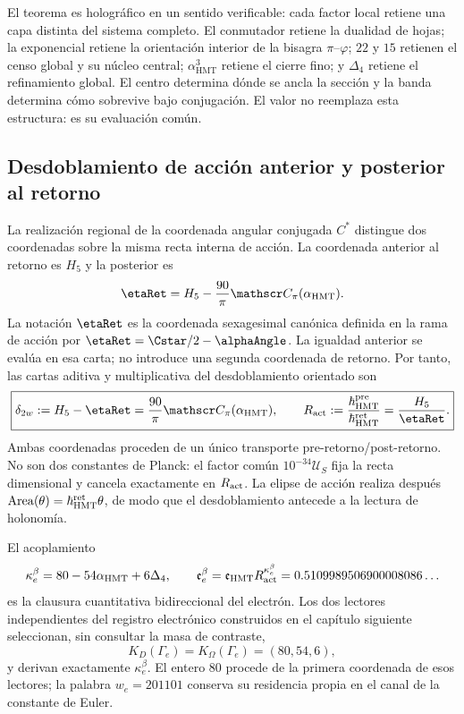 El teorema es holográfico en un sentido verificable: cada factor local
retiene una capa distinta del sistema completo. El conmutador retiene la
dualidad de hojas; la exponencial retiene la orientación interior de la
bisagra \(\pi\)--\(\varphi\); \(22\) y \(15\) retienen el censo global y
su núcleo central; \(\alpha_{\mathrm{HMT}}^3\) retiene el cierre fino; y
\(\Delta_4\) retiene el refinamiento global. El centro determina dónde se
ancla la sección y la banda determina cómo sobrevive bajo conjugación.
El valor no reemplaza esta estructura: es su evaluación común.

\subsection{Desdoblamiento de acción anterior y posterior al retorno}
\label{sec:electron-desdoblamiento-two-way-rev9}

La realización regional de la coordenada angular conjugada \(C^*\) distingue dos coordenadas sobre la
misma recta interna de acción. La coordenada anterior al retorno es \(H_5\) y
la posterior es
\[
\etaRet
 =H_5-\frac{90}{\pi}\mathscr C_\pi(\alpha_{\rm HMT}).
\]
La notación \(\etaRet\) es la coordenada sexagesimal canónica definida en la
rama de acción por \(\etaRet=\Cstar/2-\alphaAngle\). La igualdad anterior se
evalúa en esa carta; no introduce una segunda coordenada de retorno.
Por tanto, las cartas aditiva y multiplicativa del desdoblamiento orientado
son
\begin{equation}
 \boxed{
 \delta_{2w}:=H_5-\etaRet
 =\frac{90}{\pi}\mathscr C_\pi(\alpha_{\rm HMT}),
 \qquad
 R_{\rm act}:=\frac{\hbar^{\rm pre}_{\rm HMT}}
 {\hbar^{\rm ret}_{\rm HMT}}
 =\frac{H_5}{\etaRet}.}
 \label{eq:electron-desdoblamiento-two-way-rev9}
\end{equation}
Ambas coordenadas proceden de un único transporte pre-retorno/post-retorno.
No son dos constantes de Planck: el factor común
\(10^{-34}\mathcal U_S\) fija la recta dimensional y cancela exactamente en
\(R_{\rm act}\). La elipse de acción realiza después
\(\operatorname{Area}(\theta)=\hbar_{\rm HMT}^{\rm ret}\theta\), de modo que
el desdoblamiento antecede a la lectura de holonomía.

El acoplamiento
\begin{equation}
 \kappa_e^{\beta}
 =80-54\alpha_{\rm HMT}+6\Delta_4,
 \qquad
 \mathfrak e_e^{\beta}
 =\mathfrak e_{\rm HMT}R_{\rm act}^{\kappa_e^{\beta}}
 =0.5109989506900008086\ldots
 \label{eq:electron-beta-two-way-rev9}
\end{equation}
es la clausura cuantitativa bidireccional del electrón. Los dos lectores
independientes del registro electrónico construidos en el capítulo siguiente
seleccionan, sin consultar la masa de contraste,
\[
 K_D(\Gamma_e)=K_\Omega(\Gamma_e)=(80,54,6),
\]
y derivan exactamente \(\kappa_e^\beta\). El entero \(80\) procede de la
primera coordenada de esos lectores; la palabra \(w_e=201101\) conserva su
residencia propia en el canal de la constante de Euler.


